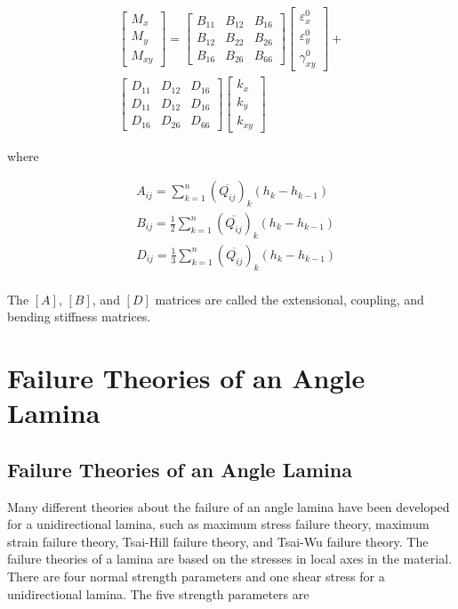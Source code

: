 \documentclass[Afour,sageh,times]{sagej}
\begin{document}
\begin{equation}
\begin{array}{l}
	\begin{bmatrix}
		M_x \\
		M_y \\
		M_{xy}
	\end{bmatrix}
	=
	\begin{bmatrix}
		B_{11} & B_{12} & B_{16} \\
		B_{12} & B_{22} & B_{26} \\
		B_{16} & B_{26} & B_{66} 
	\end{bmatrix}
    \begin{bmatrix}
		\varepsilon_x^0 \\
        \varepsilon_y^0 \\
		\gamma_{xy}^0
    \end{bmatrix} 
	+ \\
	\begin{bmatrix}
		D_{11} & D_{12} & D_{16} \\
		D_{11} & D_{12} & D_{16} \\
		D_{16} & D_{26} & D_{66} 
	\end{bmatrix}
	\begin{bmatrix}
		k_x \\
		k_y \\
		k_{xy} 
	\end{bmatrix}
	\end{array}
\end{equation}


where

\begin{equation}
    \begin{split}
    &A_{ij}
	=
	\sum_{k=1}^n(\overline{Q_{ij}})_k(h_k-h_{k-1}) \\
    &B_{ij}
	=
	\frac{1}{2}\sum_{k=1}^n(\overline{Q_{ij}})_k(h_k-h_{k-1}) \\
    &D_{ij}
	=
	\frac{1}{3}\sum_{k=1}^n(\overline{Q_{ij}})_k(h_k-h_{k-1}) \\
    \end{split}
\end{equation}

The $[A]$, $[B]$, and $[D]$ matrices are called the extensional, coupling, and bending stiffness
matrices.


\section{Failure Theories of an Angle Lamina}
\subsection{Failure Theories of an Angle Lamina}
Many different theories about the failure of an angle lamina have been developed for a
unidirectional lamina, such as maximum stress failure theory, maximum strain failure theory,
Tsai-Hill failure theory, and Tsai-Wu failure theory. The failure theories of a lamina are based on
the stresses in local axes in the material. There are four normal strength parameters and one shear
stress for a unidirectional lamina. The five strength parameters are
\end{document}
